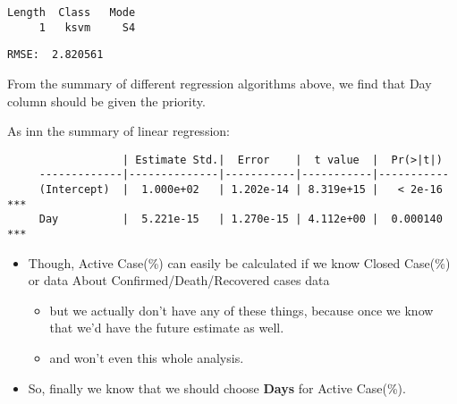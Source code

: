 \documentclass[11pt]{article}
\providecommand{\tightlist}{%
      \setlength{\itemsep}{0pt}\setlength{\parskip}{0pt}}
\begin{document}
    
    \begin{verbatim}
Length  Class   Mode 
     1   ksvm     S4 
    \end{verbatim}

    
    \begin{Verbatim}[commandchars=\\\{\}]
RMSE:  2.820561
    \end{Verbatim}

     From the summary of different regression algorithms above, we find that
Day column should be given the priority.

As inn the summary of linear regression:

\begin{verbatim}
                  | Estimate Std.|  Error    |  t value  |  Pr(>|t|)  
     -------------|--------------|-----------|-----------|-----------
     (Intercept)  |  1.000e+02   | 1.202e-14 | 8.319e+15 |   < 2e-16  ***
     Day          |  5.221e-15   | 1.270e-15 | 4.112e+00 |  0.000140  ***
\end{verbatim}

\begin{itemize}
\tightlist
\item
  Though, Active Case(\%) can easily be calculated if we know Closed
  Case(\%) or data About Confirmed/Death/Recovered cases data

  \begin{itemize}
  \tightlist
  \item
    but we actually don't have any of these things, because once we know
    that we'd have the future estimate as well.
  \item
    and won't even this whole analysis. 
  \end{itemize}
\item
  So, finally we know that we should choose \textbf{Days} for Active
  Case(\%). 
\end{itemize}
\end{document}

